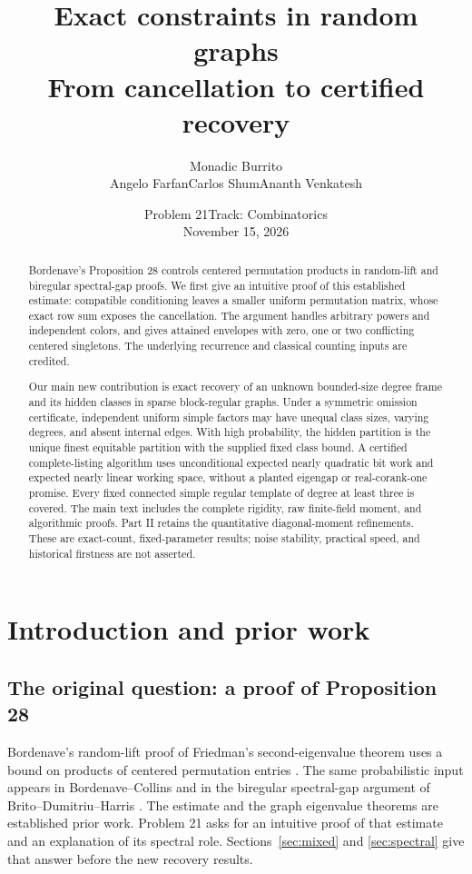 \documentclass[11pt]{article}
\title{Exact constraints in random graphs\\ From cancellation to certified recovery}
\author{Monadic Burrito\\Angelo Farfan\quad Carlos Shum\quad Ananth Venkatesh}
\date{Problem 21\quad Track: Combinatorics\\November 15, 2026}
\theoremstyle{definition}
\theoremstyle{remark}
\newcommand{\1}{\mathbf 1}
\begin{document}
\maketitle
\begin{abstract}
Bordenave's Proposition 28 controls centered permutation products in
random-lift and biregular spectral-gap proofs. We first give an intuitive
proof of this established estimate: compatible conditioning leaves a
smaller uniform permutation matrix, whose exact row sum exposes the
cancellation. The argument handles arbitrary powers and independent
colors, and gives attained envelopes with zero, one or two conflicting
centered singletons. The underlying recurrence and classical counting
inputs are credited.

Our main new contribution is exact recovery of an unknown bounded-size
degree frame and its hidden classes in sparse block-regular graphs.
Under a symmetric omission certificate, independent uniform simple
factors may have unequal class sizes, varying degrees, and absent internal
edges. With high probability, the hidden partition is the unique finest
equitable partition with the supplied fixed class bound. A certified
complete-listing algorithm uses unconditional expected nearly quadratic
bit work and expected nearly linear working space, without a planted eigengap or
real-corank-one promise. Every fixed connected simple regular template of
degree at least three is covered. The main text includes the complete
rigidity, raw finite-field moment, and algorithmic proofs. Part II retains the quantitative diagonal-moment refinements.
These are exact-count, fixed-parameter results; noise stability, practical
speed, and historical firstness are not asserted.
\end{abstract}
\clearpage
\begingroup\small
\tableofcontents
\endgroup
\clearpage
\section{Introduction and prior work}\label{sec:report-introduction}
\subsection{The original question: a proof of Proposition 28}
Bordenave's random-lift proof of Friedman's second-eigenvalue theorem
uses a bound on products of centered permutation entries
\cite[Proposition 28]{Bordenave}. The same probabilistic input appears in
Bordenave--Collins \cite[Proposition 22]{BC} and in the biregular
spectral-gap argument of Brito--Dumitriu--Harris \cite[Lemma 5.6]{BDH}.
The estimate and the graph eigenvalue theorems are established prior
work. Problem 21 asks for an intuitive proof of that estimate and an
explanation of its spectral role. Sections~\ref{sec:mixed} and
\ref{sec:spectral} give that answer before the new recovery results.
\end{document}
